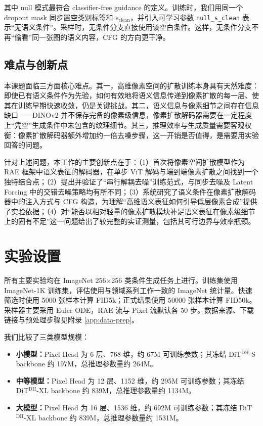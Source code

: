 \documentclass[11pt]{article}
\begin{document}
其中 null 模式最符合 classifier-free guidance 的定义。训练时，我们用同一个 dropout mask 同步置空类别标签和 $s_{\mathrm{clean}}$，并引入可学习参数 \texttt{null\_s\_clean} 表示“无语义条件”。采样时，无条件分支直接使用该空白条件。这样，无条件分支不再“偷看”同一张图的语义内容，CFG 的方向更干净。

\subsection{难点与创新点}

本课题面临三方面核心难点。其一，高维像素空间的扩散训练本身具有天然难度：即使已有语义条件作为先验，如何有效地将语义信息传递到像素扩散的每一层、使其在训练早期快速收敛，仍是关键挑战。其二，语义信息与像素细节之间存在信息缺口——DINOv2 并不保存完备的像素级信息，像素扩散解码器需要在一定程度上“凭空”生成条件中未包含的纹理细节。其三，推理效率与生成质量需要客观权衡：像素扩散解码器额外增加约一倍去噪步骤，这一开销是否值得，是需要用实验回答的问题。

针对上述问题，本工作的主要创新点在于：（1）首次将像素空间扩散模型作为 RAE 框架中语义表征的解码器，在单步 ViT 解码与端到端像素扩散之间找到一个独特结合点；（2）提出并验证了“串行解耦去噪”训练范式，与同步去噪及 Latent Forcing 中的交错去噪策略均有所不同；（3）系统研究了语义条件在像素扩散解码器中的注入方式与 CFG 构造，为理解“高维语义表征如何引导低层像素合成”提供了实验依据；（4）对“能否以相对轻量的像素扩散模块补足语义表征在像素级细节上的固有不足”这一问题给出了较完整的实证测量，包括其可行边界与效率瓶颈。

\section{实验设置}

所有主要实验均在 ImageNet 256$\times$256 类条件生成任务上进行。训练集使用 ImageNet-1K 训练集，评估使用与领域系列工作一致的 ImageNet 统计量。快速筛选时使用 5000 张样本计算 FID5k；正式结果使用 50000 张样本计算 FID50k。采样器主要采用 Euler ODE，RAE 流与 Pixel 流默认各 50 步。数据来源、下载链接与预处理步骤见附录 \ref{app:data-prep}。

我们比较了三类模型规模：
\begin{itemize}
    \item \textbf{小模型：}Pixel Head 为 6 层、768 维，约 67M 可训练参数；其冻结 DiT$^{\mathrm{DH}}$-S backbone 约 197M，总推理参数量约 264M。
    \item \textbf{中等模型：}Pixel Head 为 12 层、1152 维，约 295M 可训练参数；其冻结 DiT$^{\mathrm{DH}}$-XL backbone 约 839M，总推理参数量约 1134M。
    \item \textbf{大模型：}Pixel Head 为 16 层、1536 维，约 692M 可训练参数；其冻结 DiT$^{\mathrm{DH}}$-XL backbone 约 839M，总推理参数量约 1531M。
\end{itemize}
\end{document}
